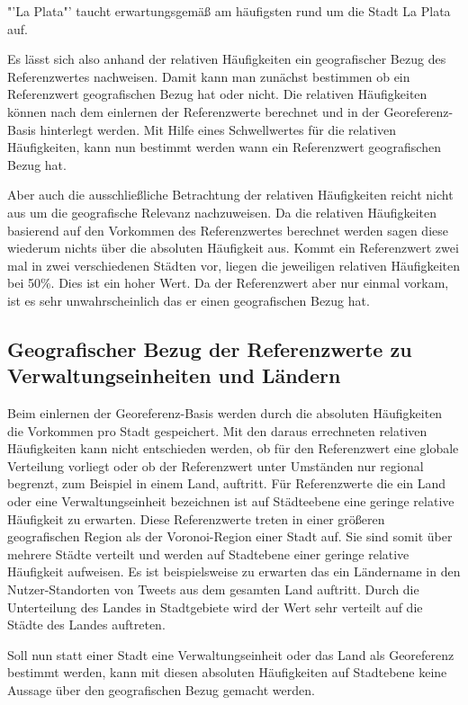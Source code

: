 				"'La Plata"' taucht erwartungsgemäß am häufigsten rund um die Stadt La Plata auf.  

				Es lässt sich also anhand der relativen Häufigkeiten ein geografischer Bezug des Referenzwertes nachweisen.
				Damit kann man zunächst bestimmen ob ein Referenzwert geografischen Bezug hat oder nicht.
				Die relativen Häufigkeiten können nach dem einlernen der Referenzwerte berechnet und in der Georeferenz-Basis hinterlegt werden.
				Mit Hilfe eines Schwellwertes für die relativen Häufigkeiten, kann nun bestimmt werden wann ein Referenzwert geografischen Bezug hat.

				Aber auch die ausschließliche Betrachtung der relativen Häufigkeiten reicht nicht aus um die geografische Relevanz nachzuweisen.
				Da die relativen Häufigkeiten basierend auf den Vorkommen des Referenzwertes berechnet werden sagen diese wiederum nichts über die absoluten Häufigkeit aus. 
				Kommt ein Referenzwert zwei mal in zwei verschiedenen Städten vor, liegen die jeweiligen relativen Häufigkeiten bei 50\%.
				Dies ist ein hoher Wert.
				Da der Referenzwert aber nur einmal vorkam, ist es sehr unwahrscheinlich das er einen geografischen Bezug hat.   

		\subsection{Geografischer Bezug der Referenzwerte zu Verwaltungseinheiten und Ländern} 

			Beim einlernen der Georeferenz-Basis werden durch die absoluten Häufigkeiten die Vorkommen pro Stadt gespeichert.
			Mit den daraus errechneten relativen Häufigkeiten kann nicht entschieden werden, ob für den Referenzwert eine globale Verteilung vorliegt oder ob der Referenzwert unter Umständen nur regional begrenzt, zum Beispiel in einem Land, auftritt.
			Für Referenzwerte die ein Land oder eine Verwaltungseinheit bezeichnen ist auf Städteebene eine geringe relative Häufigkeit zu erwarten.
			Diese Referenzwerte treten in einer größeren geografischen Region als der Voronoi-Region einer Stadt auf.
			Sie sind somit über mehrere Städte verteilt und werden auf Stadtebene einer geringe relative Häufigkeit aufweisen.
			Es ist beispielsweise zu erwarten das ein Ländername in den Nutzer-Standorten von Tweets aus dem gesamten Land auftritt.
			Durch die Unterteilung des Landes in Stadtgebiete wird der Wert sehr verteilt auf die Städte des Landes auftreten.

			Soll nun statt einer Stadt eine Verwaltungseinheit oder das Land als Georeferenz bestimmt werden, kann mit diesen absoluten Häufigkeiten auf Stadtebene keine Aussage über den geografischen Bezug gemacht werden. 
			
